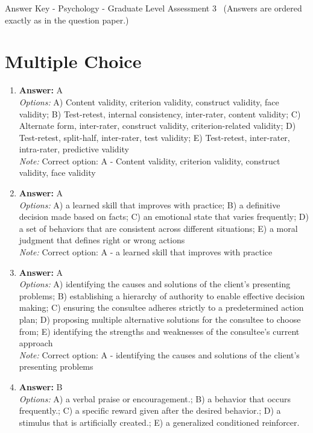 \documentclass[12pt]{article}
\begin{document}
\begin{center}
Answer Key - Psychology - Graduate Level Assessment 3 \
\small (Answers are ordered exactly as in the question paper.)
\end{center}

\section*{Multiple Choice}
\begin{enumerate}[label=\arabic*.]
\item \textbf{Answer:} A
\\ \textit{Options:} A) Content validity, criterion validity, construct validity, face validity; B) Test-retest, internal consistency, inter-rater, content validity; C) Alternate form, inter-rater, construct validity, criterion-related validity; D) Test-retest, split-half, inter-rater, test validity; E) Test-retest, inter-rater, intra-rater, predictive validity
\\ \textit{Note:} Correct option: A - Content validity, criterion validity, construct validity, face validity
\item \textbf{Answer:} A
\\ \textit{Options:} A) a learned skill that improves with practice; B) a definitive decision made based on facts; C) an emotional state that varies frequently; D) a set of behaviors that are consistent across different situations; E) a moral judgment that defines right or wrong actions
\\ \textit{Note:} Correct option: A - a learned skill that improves with practice
\item \textbf{Answer:} A
\\ \textit{Options:} A) identifying the causes and solutions of the client's presenting problems; B) establishing a hierarchy of authority to enable effective decision making; C) ensuring the consultee adheres strictly to a predetermined action plan; D) proposing multiple alternative solutions for the consultee to choose from; E) identifying the strengths and weaknesses of the consultee's current approach
\\ \textit{Note:} Correct option: A - identifying the causes and solutions of the client's presenting problems
\item \textbf{Answer:} B
\\ \textit{Options:} A) a verbal praise or encouragement.; B) a behavior that occurs frequently.; C) a specific reward given after the desired behavior.; D) a stimulus that is artificially created.; E) a generalized conditioned reinforcer.

\end{enumerate}
\end{document}
